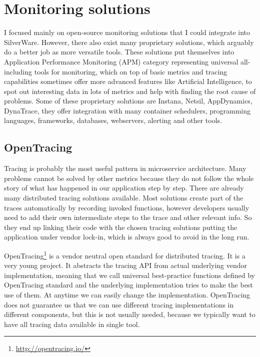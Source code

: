 \documentclass[12pt,oneside]{fithesis2}
\begin{document}
\section{Monitoring solutions}

I focused mainly on open-source monitoring solutions that I could integrate into SilverWare. However, there also exist many proprietary solutions, which arguably do a better job as more versatile tools. These solutions put themselves into Application Performance Monitoring (APM) category representing universal all-including tools for monitoring, which on top of basic metrics and tracing capabilities sometimes offer more advanced features like Artificial Intelligence, to spot out interesting data in lots of metrics and help with finding the root cause of problems. Some of these proprietary solutions are Instana, Netsil, AppDynamics, DynaTrace, they offer integration with many container schedulers, programming languages, frameworks, databases, webservers, alerting and other tools.

\subsection{OpenTracing}

Tracing is probably the most useful pattern in microservice architecture. Many problems cannot be solved by other metrics because they do not follow the whole story of what has happened in our application step by step. There are already many distributed tracing solutions available. Most solutions create part of the traces automatically by recording invoked functions, however developers usually need to add their own intermediate steps to the trace and other relevant info. So they end up linking their code with the chosen tracing solutions putting the application under vendor lock-in, which is always good to avoid in the long run.

OpenTracing\footnote{\url{http://opentracing.io/}} is a vendor neutral open standard for distributed tracing. It is a very young project. It abstracts the tracing API from actual underlying vendor implementation, meaning that we call universal best-practice functions defined by OpenTracing standard and the underlying implementation tries to make the best use of them. At anytime we can easily change the implementation. OpenTracing does not guarantee us that we can use different tracing implementations in different components, but this is not usually needed, because we typically want to have all tracing data available in single tool.
\end{document}
